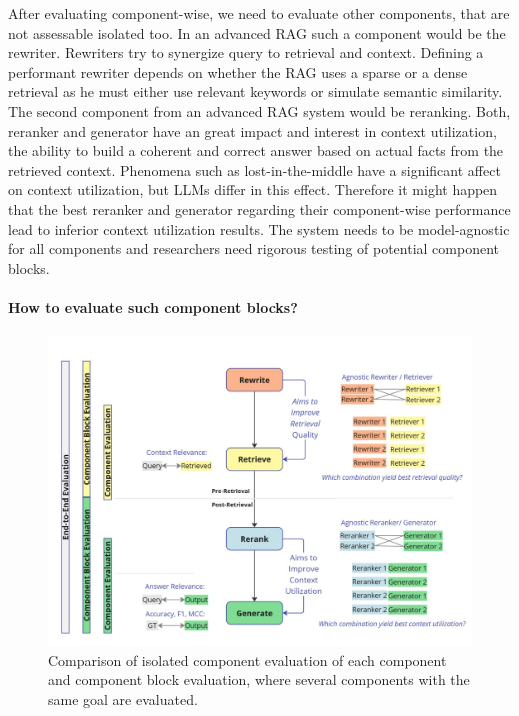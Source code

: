 After evaluating component-wise, we need to evaluate other components, that are not assessable isolated too. In an advanced RAG such a component would be the rewriter. Rewriters try to synergize query to retrieval and context. Defining a performant rewriter depends on whether the RAG uses a sparse or a dense retrieval as he must either use relevant keywords or simulate semantic similarity. The second component from an advanced RAG system would be reranking. Both, reranker and generator have an great impact and interest in context utilization, the ability to build a coherent and correct answer based on actual facts from the retrieved context. Phenomena such as lost-in-the-middle have a significant affect on context utilization, but LLMs differ in this effect.\cite{Liu.06.07.2023} Therefore it might happen that the best reranker and generator regarding their component-wise performance lead to inferior context utilization results. The system needs to be model-agnostic for all components and researchers need rigorous testing of potential component blocks. 

\paragraph{How to evaluate such component blocks?}

\begin{figure}
  \centering
  \includegraphics[width=\textwidth]{images/ComponentBlockEvaluation.pdf}
  \caption{Comparison of isolated component evaluation of each component and component block evaluation, where several components with the same goal are evaluated.}
  \label{fig:componentblockeval}
\end{figure}


